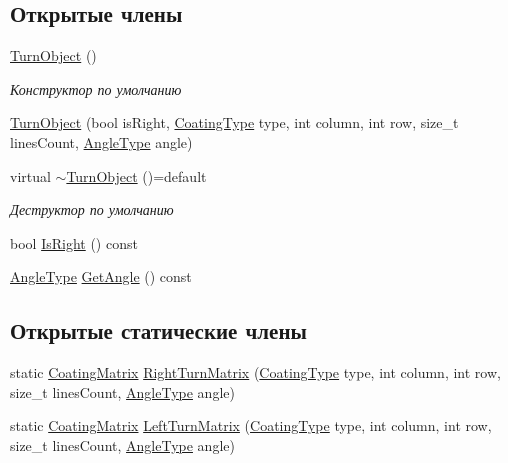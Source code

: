 \subsection*{Открытые члены}
\begin{DoxyCompactItemize}
\item 
\mbox{\label{classrtm_1_1_turn_object_a987baa86c69edf1f23d1fcb2d3140ca9}} 
\hyperlink{classrtm_1_1_turn_object_a987baa86c69edf1f23d1fcb2d3140ca9}{Turn\+Object} ()
\begin{DoxyCompactList}\small\item\em Конструктор по умолчанию \end{DoxyCompactList}\item 
\hyperlink{classrtm_1_1_turn_object_ac673c94a34ee6dd7ece82a41fb8f7930}{Turn\+Object} (bool is\+Right, \hyperlink{namespacertm_aecd3929e64cd461eb3555b611f6fad95}{Coating\+Type} type, int column, int row, size\+\_\+t lines\+Count, \hyperlink{namespacertm_a69dc82b16a0148c10962caa83d930f89}{Angle\+Type} angle)
\item 
\mbox{\label{classrtm_1_1_turn_object_a50ff1135e100a02294bb433ffd0a7dc6}} 
virtual \hyperlink{classrtm_1_1_turn_object_a50ff1135e100a02294bb433ffd0a7dc6}{$\sim$\+Turn\+Object} ()=default
\begin{DoxyCompactList}\small\item\em Деструктор по умолчанию \end{DoxyCompactList}\item 
bool \hyperlink{classrtm_1_1_turn_object_ab2958c0a469d4835751b304e2bd16084}{Is\+Right} () const
\item 
\hyperlink{namespacertm_a69dc82b16a0148c10962caa83d930f89}{Angle\+Type} \hyperlink{classrtm_1_1_turn_object_ae3fbfdd8e940bbb61d3a68db236d60b5}{Get\+Angle} () const
\end{DoxyCompactItemize}
\subsection*{Открытые статические члены}
\begin{DoxyCompactItemize}
\item 
static \hyperlink{namespacertm_ae3bb29510cfde424975be31866d2486e}{Coating\+Matrix} \hyperlink{classrtm_1_1_turn_object_a74dbdda621e1fbe6be1fe6373949bbad}{Right\+Turn\+Matrix} (\hyperlink{namespacertm_aecd3929e64cd461eb3555b611f6fad95}{Coating\+Type} type, int column, int row, size\+\_\+t lines\+Count, \hyperlink{namespacertm_a69dc82b16a0148c10962caa83d930f89}{Angle\+Type} angle)
\item 
static \hyperlink{namespacertm_ae3bb29510cfde424975be31866d2486e}{Coating\+Matrix} \hyperlink{classrtm_1_1_turn_object_a329c8abcba91f87b0dce98543d7448ba}{Left\+Turn\+Matrix} (\hyperlink{namespacertm_aecd3929e64cd461eb3555b611f6fad95}{Coating\+Type} type, int column, int row, size\+\_\+t lines\+Count, \hyperlink{namespacertm_a69dc82b16a0148c10962caa83d930f89}{Angle\+Type} angle)
\end{DoxyCompactItemize}
